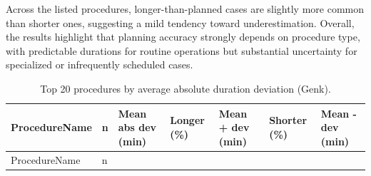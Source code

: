 \documentclass[
]{article}
\begin{document}
Across the listed procedures, longer-than-planned cases are slightly
more common than shorter ones, suggesting a mild tendency toward
underestimation. Overall, the results highlight that planning accuracy
strongly depends on procedure type, with predictable durations for
routine operations but substantial uncertainty for specialized or
infrequently scheduled cases.

\begin{longtable}[]{@{}
  >{\centering\arraybackslash}p{}
  >{\centering\arraybackslash}p{}
  >{\centering\arraybackslash}p{}
  >{\centering\arraybackslash}p{}
  >{\centering\arraybackslash}p{}
  >{\centering\arraybackslash}p{}
  >{\centering\arraybackslash}p{}@{}}
\caption{Top 20 procedures by average absolute duration deviation
(Genk). \label{tab:duration_dev_proc}}\tabularnewline
\toprule\noalign{}
\begin{minipage}[b]{\linewidth}\centering
ProcedureName
\end{minipage} & \begin{minipage}[b]{\linewidth}\centering
n
\end{minipage} & \begin{minipage}[b]{\linewidth}\centering
Mean abs dev (min)
\end{minipage} & \begin{minipage}[b]{\linewidth}\centering
Longer (\%)
\end{minipage} & \begin{minipage}[b]{\linewidth}\centering
Mean + dev (min)
\end{minipage} & \begin{minipage}[b]{\linewidth}\centering
Shorter (\%)
\end{minipage} & \begin{minipage}[b]{\linewidth}\centering
Mean - dev (min)
\end{minipage} \\
\midrule\noalign{}
\endfirsthead
\toprule\noalign{}
\begin{minipage}[b]{\linewidth}\centering
ProcedureName
\end{minipage} & \begin{minipage}[b]{\linewidth}\centering
n
\end{minipage} & \begin{minipage}[b]{\linewidth}\centering

\end{minipage}
\end{longtable}
\end{document}
